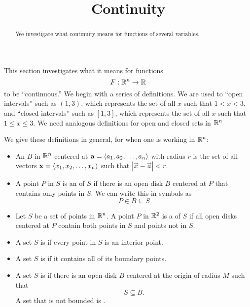 \documentclass{ximera}
\title[Dig-In:]{Continuity}
\begin{document}
\begin{abstract}
We investigate what continuity means for functions of several variables.
\end{abstract}
\maketitle


This section investigates what it means for functions
\[
F:\mathbb R^n\to \mathbb R
\]
to be ``continuous.'' We begin with a series of definitions. We are
used to ``open intervals'' such as $(1,3)$, which represents the set
of all $x$ such that $1<x<3$, and ``closed intervals'' such as
$[1,3]$, which represents the set of all $x$ such that $1\leq x\leq
3$. We need analogous definitions for open and closed sets in $\mathbb R^n$

\begin{definition}
  We give these definitions in general, for when one is working in
  $\mathbb R^n$:
  \begin{itemize}
  \item An  $B$ in $\mathbb R^n$ centered at $\mathbf{a} =
    \left\langle a_1,a_2,\dots,a_n\right\rangle$ with radius $r$ is the set of all
    vectors $\mathbf{x}=\left\langle x_1,x_2,\dots,x_n\right\rangle$ such that
    $|\vec{x}-\vec{a}| < r$.
  \item A point $P$ in $S$ is an  of $S$ if there
    is an open disk $B$ centered at $P$ that contains only points in
    $S$. We can write this in symbols as
    \[
    P\in B\subseteq S
    \]
  \item Let $S$ be a set of points in $\mathbb R^n$. A point $P$ in $\mathbb R^2$ is
    a  of $S$ if all open disks centered at $P$
    contain both points in $S$ and points not in $S$.
  \item A set $S$ is  if every point in $S$ is an interior
    point.
  \item A set $S$ is  if it contains all of its boundary
    points.
  \item A set $S$ is  if there is an open disk $B$
    centered at the origin of radius $M$ such that
    \[
    S\subseteq B.
    \]
    A set that is not bounded is .
  \end{itemize}
\end{definition}
\end{document}
